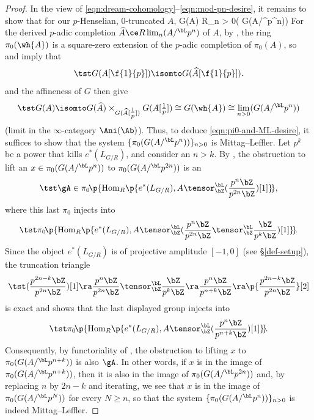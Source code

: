 \begin{proof}
In the view of \eqref{eqn:dream-cohomology}--\eqref{eqn:mod-pn-desire}, it remains to show that for our $p$-Henselian, $0$-truncated $A$,
\be \label{eqn:pi0-and-ML-desire}
\tst G(A) \isomto R\lim_{n > 0}( G(A/^\bL p^n)) \q{}
\ee
For the derived $p$-adic completion $\widehat{A} \ce R\lim_n (A/^\bL p^n)$ of $A$, by  , the ring $\pi_0(\wh{A})$
is a square-zero extension of the $p$-adic completion of $\pi_0(A)$, so  and  %
imply that
\[
\tst G(A[\f{1}{p}]) \isomto G(\widehat{A}[\f{1}{p}]).
\]
 and the affineness of $G$ then give
\[
\tst G(A) \isomto G(\widehat{A})\times_{G(\widehat{A}[\tfrac 1p])} G(A[\tfrac 1p]) \cong G(\wh{A}) \cong  \lim_{n > 0}( G(A/^\bL p^n))
\]
(limit in the $\infty$-category $\Ani(\Ab)$). Thus, to deduce \eqref{eqn:pi0-and-ML-desire}, it suffices to show that the system $\{\pi_0 (G(A/^\bL p^n))\}_{n > 0}$ is Mittag--Leffler. Let $p^k$ be a power that kills $e^*(L_{G/R})$, and consider an $n > k$. By , the obstruction to lift an $x \in \pi_0(G(A/^\bL p^n))$ to $\pi_0(G(A/^\bL p^{2n}))$ is an
\[%
\source{purity-flat-cohomology}
\tst \gA \in \pi_0\!\p{\Hom_R\!\p{e^*(L_{G/R}), A\tensor^\bL_\bZ(\frac{p^n\bZ}{p^{2n}\bZ})[1]}\!},
\]
where this last $\pi_0$ injects into
\[
\tst\pi_0\!\p{\Hom_R\!\p{e^*(L_{G/R}), A\tensor^\bL_\bZ(\frac{p^n\bZ}{p^{2n}\bZ} \tensor^\bL_\bZ \frac{\bZ}{p^k\bZ})[1]}\!}\!.
\]%
Since the object $e^*(L_{G/R})$ is of projective amplitude $[-1, 0]$ (see \S\ref{def-setup}), the truncation triangle
\[
\tst (\frac{p^{2n - k}\bZ}{p^{2n}\bZ})[1] \ra \frac{p^n\bZ}{p^{2n}\bZ} \tensor^\bL_\bZ \frac{\bZ}{p^k\bZ} \ra \frac{p^n\bZ}{p^{n + k}\bZ} \ra \p{\frac{p^{2n - k}\bZ}{p^{2n}\bZ}}[2]
\]
is exact and shows that the last displayed group injects into
\[%
\source{purity-flat-cohomology}
\tst \pi_0\!\p{\Hom_R\!\p{e^*(L_{G/R}), A\tensor^\bL_\bZ (\frac{p^n\bZ}{p^{n + k}\bZ})[1]}\!}\!.
\]%
Consequently, by functoriality of , the obstruction to lifting $x$ to $\pi_0(G(A/^\bL p^{n + k}))$ is also $\gA$. In other words, if $x$ is in the image of $\pi_0(G(A/^\bL p^{n + k}))$, then it is also in the image of $\pi_0(G(A/^\bL p^{2n}))$ and, by replacing $n$ by $2n - k$ and iterating, we see that $x$ is in the image of $\pi_0(G(A/^\bL p^N))$ for every $N \ge n$, so that the system $\{\pi_0 (G(A/^\bL p^n))\}_{n > 0}$ is indeed Mittag--Leffler.
\end{proof}



